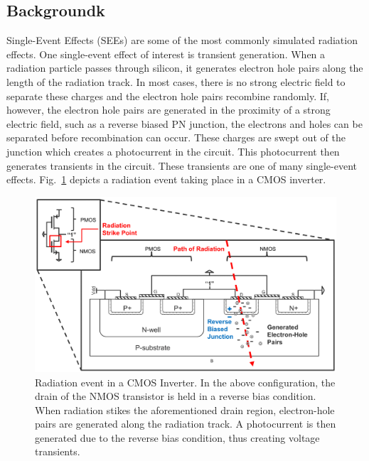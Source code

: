 \documentclass[conference]{IEEEtran}
\begin{document}
    \subsection{Backgroundk}\label{subsec:background}
    
   	Single-Event Effects (SEEs) are some of the most commonly simulated radiation effects. One single-event effect of interest is transient generation. When a radiation particle passes through silicon, it generates electron hole pairs along the length of the radiation track. In most cases, there is no strong electric field to separate these charges and the electron hole pairs recombine randomly. If, however, the electron hole pairs are generated in the proximity of a strong electric field, such as a reverse biased PN junction, the electrons and holes can be separated before recombination can occur. These charges are swept out of the junction which creates a photocurrent in the circuit. This photocurrent then generates transients in the circuit. These transients are one of many single-event effects. Fig.~\ref{fig:cmos_inverter} depicts a radiation event taking place in a CMOS inverter.
    
    \begin{figure}[htbp]
        \centering
        \includegraphics[width=1\linewidth]{Inverter_Image_B_W_cropped}
        \caption{Radiation event in a CMOS Inverter. In the above configuration, the drain of the NMOS transistor is held in a reverse bias condition. When radiation stikes the aforementioned drain region, electron-hole pairs are generated along the radiation track. A photocurrent is then generated due to the reverse bias condition, thus creating voltage transients.}
        \label{fig:cmos_inverter}
    \end{figure}
    
\end{document}
